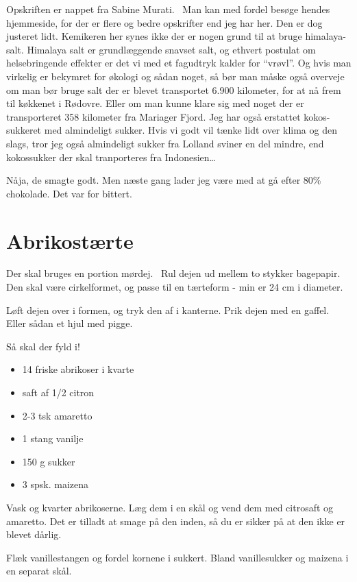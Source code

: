 \documentclass[
]{book}
\providecommand{\tightlist}{%
  \setlength{\itemsep}{0pt}\setlength{\parskip}{0pt}}
\begin{document}
Opskriften er nappet fra Sabine Murati.~ Man kan med fordel besøge hendes hjemmeside, for der er flere og bedre opskrifter end jeg har her. Den er dog justeret lidt. Kemikeren her synes ikke der er nogen grund til at bruge himalaya-salt. Himalaya salt er grundlæggende snavset salt, og ethvert postulat om helsebringende effekter er det vi med et fagudtryk kalder for ``vrøvl''. Og hvis man virkelig er bekymret for økologi og sådan noget, så bør man måske også overveje om man bør bruge salt der er blevet transportet 6.900 kilometer, for at nå frem til køkkenet i Rødovre. Eller om man kunne klare sig med noget der er transporteret 358 kilometer fra Mariager Fjord. Jeg har også erstattet kokos-sukkeret med almindeligt sukker. Hvis vi godt vil tænke lidt over klima og den slags, tror jeg også almindeligt sukker fra Lolland sviner en del mindre, end kokossukker der skal tranporteres fra Indonesien\ldots{}

Nåja, de smagte godt. Men næste gang lader jeg være med at gå efter 80\% chokolade. Det var for bittert.

\section{Abrikostærte}\label{abrikostuxe6rte}

Der skal bruges en portion mørdej.~ Rul dejen ud mellem to stykker bagepapir. Den skal være cirkelformet, og passe til en tærteform - min er 24 cm i diameter.

Løft dejen over i formen, og tryk den af i kanterne. Prik dejen med en gaffel. Eller sådan et hjul med pigge.

Så skal der fyld i!

\begin{itemize}
\tightlist
\item
  14 friske abrikoser i kvarte
\item
  saft af 1/2 citron
\item
  2-3 tsk amaretto
\item
  1 stang vanilje
\item
  150 g sukker
\item
  3 spsk. maizena
\end{itemize}

Vask og kvarter abrikoserne. Læg dem i en skål og vend dem med citrosaft og amaretto. Det er tilladt at smage på den inden, så du er sikker på at den ikke er blevet dårlig.

Flæk vanillestangen og fordel kornene i sukkert. Bland vanillesukker og maizena i en separat skål.
\end{document}
